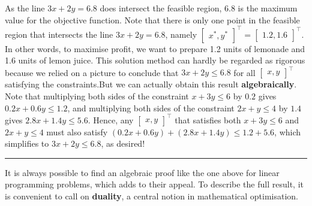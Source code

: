 As the line \(3x+2y = 6.8\) does intersect the feasible region, \(6.8\)
is the maximum value for the objective function. Note that there is only
one point in the feasible region that intersects the line \(3x+2y=6.8\),
namely
\(\begin{bmatrix} x^*, y^*\end{bmatrix}^{\!\top} = \begin{bmatrix} 1.2, 1.6\end{bmatrix}^{\!\top}.\)
In other words, to maximise profit, we want to prepare 1.2 units of
lemonade and 1.6 units of lemon juice.
\newl This solution method can hardly be regarded as rigorous because we
relied on a picture to conclude that \(3x + 2y \leq 6.8\) for all
\(\begin{bmatrix} x,y\end{bmatrix}^{\!\top}\) satisfying the constraints.\newl But we
can actually obtain  this result \textbf{algebraically}. Note that multiplying both
sides of the constraint \(x + 3y \leq 6\) by \(0.2\) gives
\(0.2x + 0.6 y \leq 1.2\), and multiplying both sides of the constraint
\(2x + y \leq 4\) by \(1.4\) gives \(2.8x + 1.4 y \leq 5.6\). Hence, any
\(\begin{bmatrix} x,y\end{bmatrix}^{\!\top}\) that satisfies both \(x+3y\leq 6\)
and \(2x+y \leq 4\) must also satisfy
\((0.2x+0.6y) + (2.8x+1.4y) \leq 1.2 + 5.6\), which simplifies to
\(3x + 2y \leq 6.8\), as desired! 
\begin{center}\rule{0.5\linewidth}{.4pt}\end{center}
It is always possible to find an algebraic proof like the one above for
linear programming problems, which adds to their appeal. To describe the full result, it is
convenient to call on \textbf{duality}, a central notion in mathematical
optimisation.

